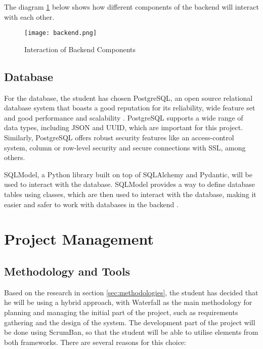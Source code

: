 The diagram \ref{fig:backend} below shows how different components of the backend will interact with each other.

\begin{figure}[htbp]
    \centering
    \texttt{[image: backend.png]}
    \caption{Interaction of Backend Components}
    \label{fig:backend}
\end{figure}

\FloatBarrier

\subsection{Database}

For the database, the student has chosen PostgreSQL, an open source relational database system that boasts a good reputation for its reliability, wide feature set and good performance and scalability \parencite{postgres}. PostgreSQL supports a wide range of data types, including JSON and UUID, which are important for this project. Similarly, PostgreSQL offers robust security features like an access-control system, column or row-level security and secure connections with SSL, among others. 

SQLModel, a Python library built on top of SQLAlchemy and Pydantic, will be used to interact with the database. SQLModel provides a way to define database tables using classes, which are then used to interact with the database, making it easier and safer to work with databases in the backend \parencite{sqlmodel}.

\section{Project Management}

\subsection{Methodology and Tools}

Based on the research in section \ref{sec:methodologies}, the student has decided that he will be using a hybrid approach, with Waterfall as the main methodology for planning and managing the initial part of the project, such as requirements gathering and the design of the system. The development part of the project will be done using ScrumBan, so that the student will be able to utilise elements from both frameworks. There are several reasons for this choice:


